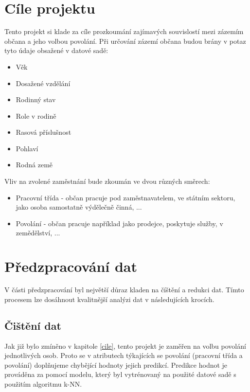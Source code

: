 \documentclass[11pt,a4paper,titlepage]{article}
\begin{document}
    \section{Cíle projektu\label{cile}}
    
    Tento projekt si klade za cíle prozkoumání zajímavých souvislostí mezi zázemím občana a jeho volbou povolání. Při určování zázemí občana budou brány v potaz tyto údaje obsažené v datové sadě:
    
    \begin{itemize}
    	\item Věk
		\item Dosažené vzdělání
		\item Rodinný stav
		\item Role v rodině
		\item Rasová příslušnost
		\item Pohlaví
		\item Rodná země
    \end{itemize}
    
    
	Vliv na zvolené zaměstnání bude zkoumán ve dvou různých směrech:
    \begin{itemize}
        \item Pracovní třída - občan pracuje pod zaměstnavatelem, ve státním sektoru, jako osoba samostatně výdělečně činná, ...
        \item Povolání - občan pracuje například jako prodejce, poskytuje služby, v zemědělství, ...
    \end{itemize}

    \section{Předzpracování dat}
        V části předzpracování byl největší důraz kladen na číštění a redukci dat. Tímto procesem lze dosáhnout kvalitnější analýzi dat v následujících krocích. 
        
        \subsection{Čištění dat}
            Jak již bylo zmíněno v kapitole \ref{cile}, tento projekt je zaměřen na volbu povolání jednotlivých osob. Proto se v atributech týkajících se povolání (pracovní třída a povolání) doplňujeme chybějící hodnoty jejich predikcí. Predikce hodnot je prováděna za pomocí modelu, který byl vytrénovaný na použité datové sadě s použitím algoritmu k-NN.
        
\end{document}
